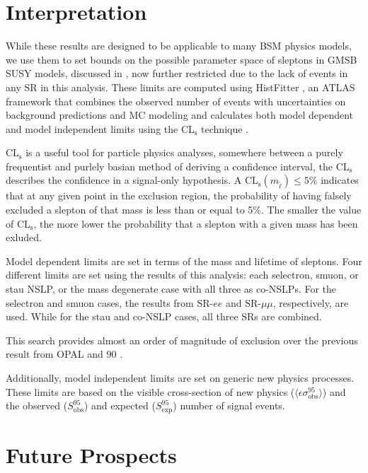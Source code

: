 \section{Interpretation}

While these results are designed to be applicable to many \ac{BSM} physics models, we use them to set bounds on the possible parameter space of sleptons in \ac{GMSB} \ac{SUSY} models, discussed in , now further restricted due to the lack of events in any \ac{SR} in this analysis. These limits are computed using HistFitter \cite{histfitter}, an \ac{ATLAS} framework that combines the observed number of events with uncertainties on background predictions and MC modeling and calculates both model dependent and model independent limits using the CL$_{\text{s}}$ technique \cite{CLs-1}. 

CL$_{\text{s}}$ is a useful tool for particle physics analyses, somewhere between a purely frequentist and purlely basian method of deriving a confidence interval, the CL$_{\text{s}}$ describes the confidence in a signal-only hypothesis. A CL$_{\text{s}}(m_{\tilde{\ell}}) \leq 5\%$ indicates that at any given point in the exclusion region, the probability of having falsely excluded a slepton of that mass is less than or equal to 5\%. The smaller the value of CL$_{\text{s}}$, the more lower the probability that a slepton with a given mass has been exluded.  

Model dependent limits are set in terms of the mass and lifetime of sleptons. Four different limits are set using the results of this analysis: each selectron, smuon, or stau \ac{NSLP}, or the mass degenerate case with all three as co-NSLPs. For the selectron and smuon cases, the results from SR-$ee$ and SR-$\mu\mu$, respectively, are used. While for the stau and co-NSLP cases, all three SRs are combined.


This search provides almost an order of magnitude of exclusion over the previous result from OPAL and 90 \GeV. 


Additionally, model independent limits are set on generic new physics processes. These limits are based on the visible cross-section of new physics ($\langle \epsilon \sigma^{95}_{\text{obs}} \rangle$) and the observed ($S^{95}_{\text{obs}}$) and expected ($S^{95}_{\text{exp}}$) number of signal events. 




\section{Future Prospects}
